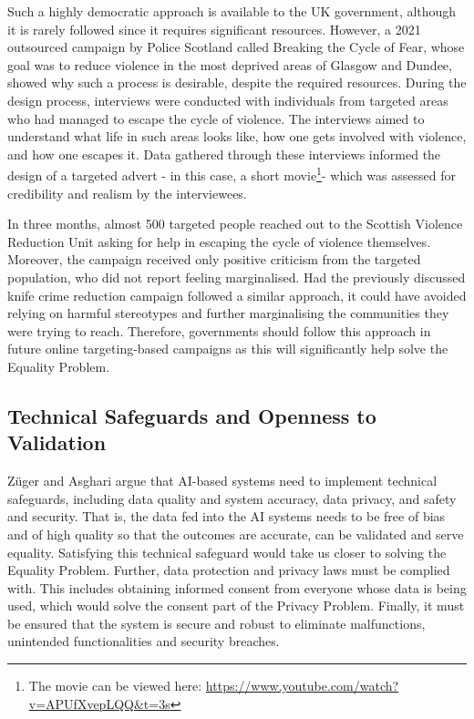 \documentclass[preprint]{acmart}
\begin{document}
Such a highly democratic approach is available to the UK government, although it is rarely followed since it requires significant resources. However, a 2021 outsourced campaign by Police Scotland called Breaking the Cycle of Fear, whose goal was to reduce violence in the most deprived areas of Glasgow and Dundee, showed why such a process is desirable, despite the required resources. During the design process, interviews were conducted with individuals from targeted areas who had managed to escape the cycle of violence. The interviews aimed to understand what life in such areas looks like, how one gets involved with violence, and how one escapes it. Data gathered through these interviews informed the design of a targeted advert - in this case, a short movie\footnote{The movie can be viewed here: \url{https://www.youtube.com/watch?v=APUfXvepLQQ\&t=3s}}- which was assessed for credibility and realism by the interviewees. 

In three months, almost 500 targeted people reached out to the Scottish Violence Reduction Unit asking for help in escaping the cycle of violence themselves. Moreover, the campaign received only positive criticism from the targeted population, who did not report feeling marginalised. Had the previously discussed knife crime reduction campaign followed a similar approach, it could have avoided relying on harmful stereotypes and further marginalising the communities they were trying to reach. Therefore, governments should follow this approach in future online targeting-based campaigns as this will significantly help solve the Equality Problem.

\subsection{Technical Safeguards and Openness to Validation}

Züger and Asghari \cite{zuger2022} argue that AI-based systems need to implement technical safeguards, including data quality and system accuracy, data privacy, and safety and security. That is, the data fed into the AI systems needs to be free of bias and of high quality so that the outcomes are accurate, can be validated and serve equality. Satisfying this technical safeguard would take us closer to solving the Equality Problem. Further, data protection and privacy laws must be complied with. This includes obtaining informed consent from everyone whose data is being used, which would solve the consent part of the Privacy Problem. Finally, it must be ensured that the system is secure and robust to eliminate malfunctions, unintended functionalities and security breaches.
\end{document}
